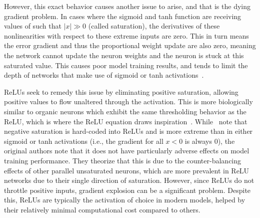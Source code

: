 However, this exact behavior causes another issue to arise, and that is the dying gradient problem.
In cases where the sigmoid and tanh function are receiving values of such that $|x|\gg0$ (called saturation),
the derivatives of these nonlinearities with respect to these
extreme inputs are zero. This in turn means the error gradient and thus the proportional weight update are also zero, meaning the
network cannot update the neuron weights and the neuron is stuck at this saturated value.
This causes poor model training results, and tends to limit the depth of networks that make use of sigmoid or
tanh activations~\citep{maas2013}.

ReLUs seek to remedy this issue by eliminating positive saturation, allowing positive values to flow unaltered through the activation.
This is more biologically similar to organic neurons which exhibit the same thresholding behavior as the ReLU, which is
where the ReLU equation draws inspiration~\citep{glorot2011}.
While~\citeauthor{glorot2011} note that negative saturation is hard-coded into ReLUs and is more extreme than in either sigmoid or
tanh activations (i.e., the gradient for all $x<0$ is always 0), the original authors note that it does not have
particularly adverse effects on model training performance.
They theorize that this is due to the counter-balancing effects of other parallel unsaturated neurons, which are
more prevalent in ReLU networks due to their single direction of saturation.
However, since ReLUs do not throttle positive inputs, gradient explosion can be a significant problem. Despite this, ReLUs
are typically the activation of choice in modern models, helped by their relatively minimal computational cost compared to
others.

